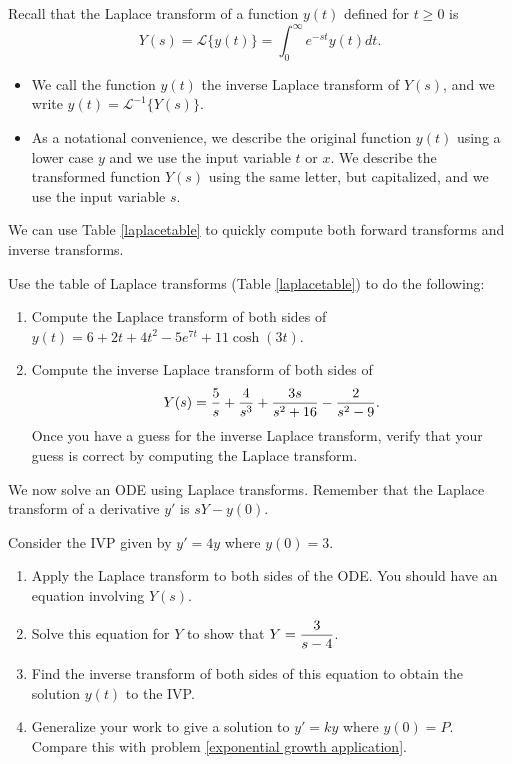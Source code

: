 \mysubsection{\ideaC}

Recall that the Laplace transform of a function $y(t)$ defined for $t\geq 0$ is $$Y(s)=\mathscr{L}\{y(t)\}=\int_0^\infty e^{-st}y(t)dt.$$ 
\begin{itemize}
 \item We call the function $y(t)$ the inverse Laplace transform of $Y(s)$, and we write $y(t)=\mathscr{L}^{-1}\{Y(s)\}$. 
 \item As a notational convenience, we describe the original function $y(t)$ using a lower case $y$ and we use the input variable $t$ or $x$. 
 We describe the transformed function $Y(s)$ using the same letter, but capitalized, and we use the input variable $s$.
\end{itemize}

We can use Table \ref{laplacetable} to quickly compute both forward transforms and inverse transforms.
\begin{problem}
 Use the table of Laplace transforms (Table \ref{laplacetable}) to do the following:
\begin{enumerate}
 \item 
{}%
Compute the Laplace transform of both sides of $y(t) = 6+2t+4t^2-5e^{7t}+11\cosh(3t)$. 
 \item Compute the inverse Laplace transform of both sides of $$\displaystyle Y(s) = \frac{5}{s}+\frac{4}{s^3}+\frac{3s}{s^2+16}-\frac{2}{s^2-9}.$$ 
 Once you have a guess for the inverse Laplace transform, verify that your guess is correct by computing the Laplace transform.
\end{enumerate}
\end{problem}

We now solve an ODE using Laplace transforms. Remember that the Laplace transform of a derivative $y'$ is $sY-y(0)$. 
\begin{problem}
%
 Consider the IVP given by $y'=4y$ where $y(0)=3$.  
 \begin{enumerate}
  \item Apply the Laplace transform to both sides of the ODE. You should have an equation involving $Y(s)$. 
  \item Solve this equation for $Y$ to show that $\displaystyle Y = \frac{3}{s-4}$. 
  \item Find the inverse transform of both sides of this equation to obtain the solution $y(t)$ to the IVP.  
  \item Generalize your work to give a solution to $y'=ky$ where $y(0) = P$.  Compare this with problem \ref{exponential growth application}.
 \end{enumerate}
\end{problem}

